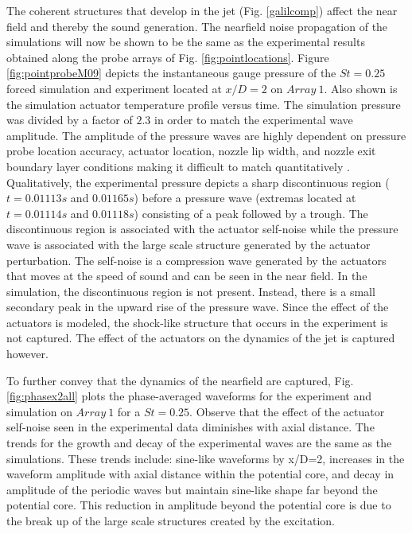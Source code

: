 \documentclass[english]{aiaa-tc}
\begin{document}
The coherent structures that develop in the jet (Fig. \ref{galilcomp}) affect the near field and thereby the sound generation.
The nearfield noise propagation of the simulations will now be shown to be the same as the experimental results obtained along the probe arrays of Fig. \ref{fig:pointlocations}.
Figure \ref{fig:pointprobeM09} depicts the instantaneous gauge pressure of the $St=0.25$ forced simulation and experiment located at $x/D=2$ on $Array~1$. Also shown is the simulation actuator temperature profile versus time. The simulation pressure was divided by a factor of $2.3$ in order to match the experimental wave amplitude. The amplitude of the pressure waves are highly dependent on pressure probe location accuracy, actuator location, nozzle lip width, and nozzle exit boundary layer conditions making it difficult to match quantitatively \cite{sinha2013}. Qualitatively, the experimental pressure depicts a sharp discontinuous region ($t=0.01113s$ and $0.01165s$)  before a pressure wave (extremas located at $t=0.01114s$ and $0.01118s$) consisting of a peak followed by a trough. The discontinuous region is associated with the actuator self-noise while the pressure wave is associated with the large scale structure generated by the actuator perturbation. The self-noise is a compression wave generated by the actuators that moves at the speed of sound and can be seen in the near field. In the simulation, the discontinuous region is not present. Instead, there is a small secondary peak in the upward rise of the pressure wave. Since the effect of the actuators is modeled, the shock-like structure that occurs in the experiment is not captured. The effect of the actuators on the dynamics of the jet is captured however.

To further convey that the dynamics of the nearfield are captured, Fig. \ref{fig:phasex2all} plots the phase-averaged waveforms for the experiment and simulation on $Array~1$ for a $St=0.25$.
Observe that the effect of the actuator self-noise seen in the experimental data diminishes with axial distance.
The trends for the growth and decay of the experimental waves are the same as the simulations. These trends include: sine-like waveforms by x/D=2, increases in the waveform amplitude with axial distance within the potential core, and decay in amplitude of the periodic waves but maintain sine-like shape far beyond the potential core.
This reduction in amplitude beyond the potential core is due to the break up of the large scale structures created by the excitation.
\end{document}
